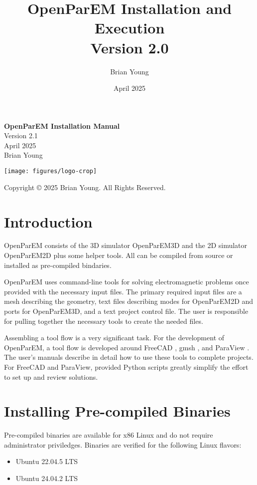 \documentclass[titlepage]{article}
\title{OpenParEM Installation and Execution\\\large Version 2.0}
\date{April 2025}
\author{Brian Young}
\renewcommand\_{\textunderscore\linebreak[1]}
\begin{document}
\begin{titlepage}

   \centering
   \vspace*{3cm}
   {\huge\bfseries OpenParEM Installation Manual} \\
   \vskip1cm
   {\Large Version 2.1} \\
   \vskip1cm
   {\Large April 2025} \\
   \vskip1cm
   {\Large Brian Young} \\

   \vfill

   \texttt{[image: figures/logo-crop]}

   \vspace*{\fill}
   Copyright \copyright{} 2025 Brian Young. All Rights Reserved.
\end{titlepage}

\tableofcontents

\newpage
\section{Introduction}

OpenParEM consists of the 3D simulator OpenParEM3D and the 2D simulator OpenParEM2D plus some helper tools.  All can be compiled from source or installed as pre-compiled bindaries.

OpenParEM uses command-line tools for solving electromagnetic problems once provided with the necessary input files.  The primary required input files are a mesh describing the geometry, text files describing modes for OpenParEM2D and ports for OpenParEM3D, and a text project control file.  The user is responsible for pulling together the necessary tools to create the needed files.

Assembling a tool flow is a very significant task.  For the development of OpenParEM, a tool flow is developed around FreeCAD \cite{freecad}, gmsh \cite{gmsh}\cite{gmshweb}, and ParaView \cite{paraview}.  The user's manuals describe in detail how to use these tools to complete projects.  For FreeCAD and ParaView, provided Python scripts greatly simplify the effort to set up and review solutions.

\section{Installing Pre-compiled Binaries}

Pre-compiled binaries are available for x86 Linux and do not require administrator priviledges.  Binaries are verified for the following Linux flavors:
\begin{itemize}[nosep]
   \item Ubuntu 22.04.5 LTS
   \item Ubuntu 24.04.2 LTS
\end{itemize}
\end{document}
